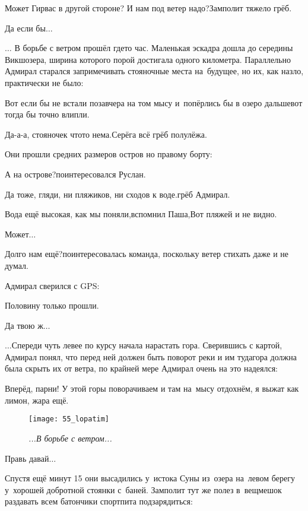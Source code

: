 \diagdash Может Гирвас в другой стороне? И нам под ветер надо?\mdash Замполит тяжело грёб.

\diagdash Да если бы$\ldots$

\vspace{1em}
$\ldots$ В борьбе с ветром прошёл где\sdash то час. Маленькая эскадра дошла до середины Викшозера, ширина которого порой достигала одного километра. Параллельно Адмирал старался запримечивать стояночные места на~будущее, но их, как назло, практически не было:

\diagdash Вот если бы не встали позавчера на том мысу и~попёрлись бы в озеро дальше\mdash вот тогда бы точно влипли.

\diagdash Да-а-а, стояночек что\sdash то нема.\mdash Серёга всё грёб полулёжа.

Они прошли средних размеров остров но правому борту:

\diagdash А на острове?\mdash поинтересовался Руслан.

\diagdash Да тоже, гляди, ни пляжиков, ни сходов к воде.\mdash грёб Адмирал.

\diagdash Вода ещё высокая, как мы поняли,\mdash вспомнил Паша,\mdash Вот пляжей и не видно.

\diagdash Может$\ldots$

\diagdash Долго нам ещё?\mdash поинтересовалась команда, поскольку ветер стихать даже и не думал.

Адмирал сверился с GPS:

\diagdash Половину только прошли.

\diagdash Да твою ж$\ldots$

\vspace{1em}
$\ldots$Спереди чуть левее по курсу начала нарастать гора. Сверившись с картой, Адмирал понял, что перед ней должен быть поворот реки и им туда\mdash гора должна была скрыть их от ветра, по крайней мере Адмирал очень на это надеялся:

\diagdash Вперёд, парни! У этой горы поворачиваем и там на~мысу отдохнём, я выжат как лимон, жара ещё.

\begin{wrapfigure}[15]{l}{0.58\textwidth}
	\centering
	\texttt{[image: 55\_lopatim]}
	\caption{\small\textit{...В борьбе с ветром...}}
\end{wrapfigure}
\diagdash Правь давай$\ldots$

Спустя ещё минут 15 они высадились у~истока Суны из~озера на~левом берегу у~хорошей добротной стоянки с~баней. Замполит тут же полез в~вещмешок раздавать всем батончики спортпита подзарядиться:

